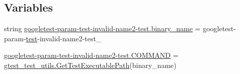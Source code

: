 \subsection*{Variables}
\begin{DoxyCompactItemize}
\item 
string \mbox{\hyperlink{namespacegoogletest-param-test-invalid-name2-test_a0e26891aaf72a6f04a60811b05a83e81}{googletest-\/param-\/test-\/invalid-\/name2-\/test.\+binary\+\_\+name}} = \textquotesingle{}googletest-\/param-\/\mbox{\hyperlink{_mutual_8h_a707ee03719e99670bf6cfdfd897b8456}{test}}-\/invalid-\/name2-\/test\+\_\+\textquotesingle{}
\item 
\mbox{\hyperlink{namespacegoogletest-param-test-invalid-name2-test_ac9395338e8bff8c30835e578658394e3}{googletest-\/param-\/test-\/invalid-\/name2-\/test.\+C\+O\+M\+M\+A\+ND}} = \mbox{\hyperlink{namespacegtest__test__utils_a89ed3717984a80ffbb7a9c92f71b86a2}{gtest\+\_\+test\+\_\+utils.\+Get\+Test\+Executable\+Path}}(binary\+\_\+name)
\end{DoxyCompactItemize}
